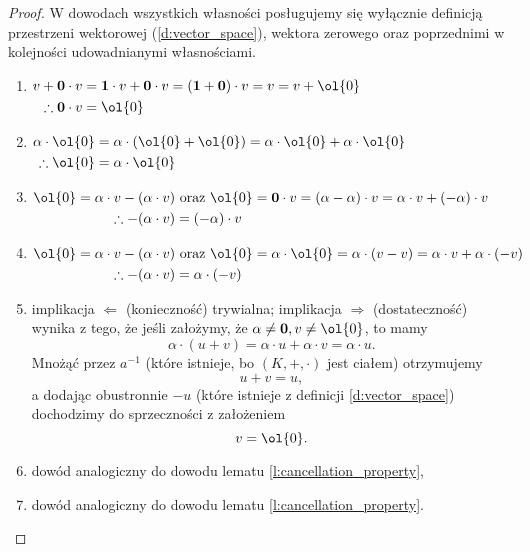 \begin{proof}
    W dowodach wszystkich własności posługujemy się wyłącznie definicją przestrzeni wektorowej (\ref{d:vector_space}), wektora zerowego oraz poprzednimi w kolejności udowadnianymi własnościami.
    \begin{enumerate}
        \item $\begin{aligned}[t]
            v + \mathbf{0} \cdot v &= \mathbf{1} \cdot v + \mathbf{0} \cdot v = (\mathbf{1} + \mathbf{0}) \cdot v = v = v + \ol{0} \\
            \therefore \mathbf{0} \cdot v &= \ol{0}
            \end{aligned}$
        \item $\begin{aligned}[t]
            \alpha \cdot \ol{0} &= \alpha \cdot (\ol{0} + \ol{0}) = \alpha \cdot \ol{0} + \alpha \cdot \ol{0} \\
            \therefore \ol{0} &= \alpha \cdot \ol{0}
            \end{aligned}$
        \item $\begin{aligned}[t]
            \ol{0} = \alpha \cdot v - (\alpha \cdot v) &\text{ oraz } \ol{0} = \mathbf{0} \cdot v = (\alpha - \alpha) \cdot v = \alpha \cdot v + (-\alpha) \cdot v \\
            \therefore -(\alpha \cdot v) &= (-\alpha) \cdot v
            \end{aligned}$
        \item $\begin{aligned}[t]
            \ol{0} = \alpha \cdot v - (\alpha \cdot v) &\text{ oraz } \ol{0} = \alpha \cdot \ol{0} = \alpha \cdot (v - v) = \alpha \cdot v + \alpha \cdot (-v) \\
            \therefore -(\alpha \cdot v) &= \alpha \cdot (-v)
            \end{aligned}$
        \item implikacja $\Leftarrow$ (konieczność) trywialna; implikacja $\Rightarrow$ (dostateczność) wynika z tego, że jeśli założymy, że $\alpha \neq \mathbf{0}, v \neq \ol{0}$, to mamy
            \[ \alpha \cdot (u + v) = \alpha \cdot u + \alpha \cdot v = \alpha \cdot u. \]
            Mnożąć przez $a^{-1}$ (które istnieje, bo $(K, +, \cdot)$ jest ciałem) otrzymujemy
            \[ u + v = u, \]
            a dodając obustronnie $-u$ (które istnieje z definicji \ref{d:vector_space}) dochodzimy do sprzeczności z założeniem
            \[ v = \ol{0}. \]
        \item dowód analogiczny do dowodu lematu \ref{l:cancellation_property},
        \item dowód analogiczny do dowodu lematu \ref{l:cancellation_property}.
    \end{enumerate}
\end{proof}


